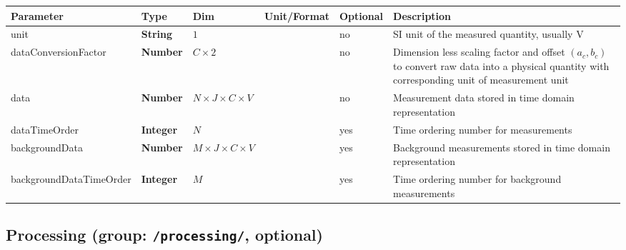 \documentclass[landscape,a4paper]{article} %
\newcommand{\inl}[1]{\lstinline[columns=fixed]{#1}}
\newcommand{\inltab}[1]{{\ttfamily\bfseries\color{blue}#1}}
\newcommand{\inlvar}[1]{{\ttfamily#1}}
\begin{document}
\noindent \begin{tabularx}{\columnwidth}{llp{3cm}llX} 
\textbf{Parameter} & \textbf{Type} & \textbf{Dim} & \textbf{Unit/Format} & \textbf{Optional} & \textbf{Description} \\ \hline 
\inlvar{unit} & \inltab{String} & $1$ & & no & SI unit of the measured quantity, usually V \\ \hline 
\inlvar{dataConversionFactor} & \inltab{Number} & $C \times 2$ & & no & Dimension less scaling factor and offset $(a_c, b_c)$ to convert raw data into a physical quantity with corresponding unit of measurement \inlvar{unit} \\ \hline 
\inlvar{data} & \inltab{Number} & $N \times J \times C \times V$ & & no & Measurement data stored in time domain representation \\ \hline 
\inlvar{dataTimeOrder} & \inltab{Integer} & $N$ & & yes & Time ordering number for measurements \\ \hline	
\inlvar{backgroundData} & \inltab{Number} &  $M \times J \times C \times V$ & & yes & Background measurements stored in time domain representation \\ \hline
 \inlvar{backgroundDataTimeOrder} & \inltab{Integer} & $M$ & & yes & Time ordering number for background measurements \\ \hline
 \end{tabularx}

\subsection{Processing (group: \inl{/processing/}, optional)}
\end{document}
